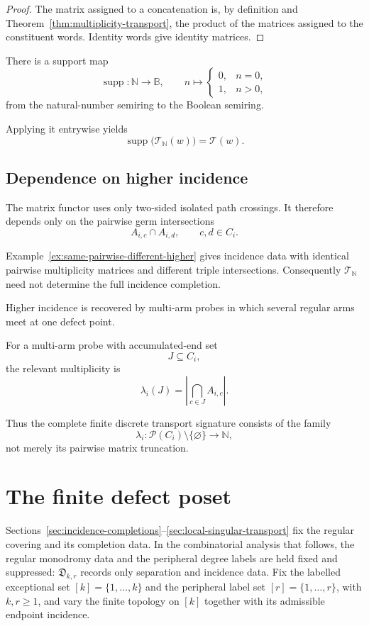 \documentclass[11pt]{article}
\theoremstyle{plain}
\theoremstyle{definition}
\begin{document}
\begin{proof}
The matrix assigned to a concatenation is, by definition and
Theorem~\ref{thm:multiplicity-transport}, the product of the matrices
assigned to the constituent words.  Identity words give identity
matrices.
\end{proof}

There is a support map
\[
\operatorname{supp}:
\mathbb N\longrightarrow\mathbb B,
\qquad
n\longmapsto
\begin{cases}
0,&n=0,\\
1,&n>0,
\end{cases}
\]
from the natural-number semiring to the Boolean semiring.

Applying it entrywise yields
\[
\operatorname{supp}
\bigl(
\mathscr T_{\mathbb N}(w)
\bigr)
=
\mathscr T(w).
\]


\subsection{Dependence on higher incidence}
\label{subsec:matrix-higher-incidence}

The matrix functor uses only two-sided isolated path crossings.  It therefore
depends only on the pairwise germ intersections
\[
A_{i,c}\cap A_{i,d},
\qquad c,d\in C_i.
\]

Example~\ref{ex:same-pairwise-different-higher} gives incidence data with identical
pairwise multiplicity matrices and different triple intersections.  Consequently
$\mathscr T_{\mathbb N}$ need not determine the full incidence completion.

Higher incidence is recovered by multi-arm probes in which several regular arms meet
at one defect point.

For a multi-arm probe with accumulated-end set
\[
J\subseteq C_i,
\]
the relevant multiplicity is
\[
\lambda_i(J)
=
\left|
\bigcap_{c\in J}A_{i,c}
\right|.
\]

Thus the complete finite discrete transport signature consists of the
family
\[
\lambda_i:
\mathcal P(C_i)\setminus\{\varnothing\}
\longrightarrow
\mathbb N,
\]
not merely its pairwise matrix truncation.





\section{The finite defect poset}
\label{sec:finite-defect-poset}

Sections~\ref{sec:incidence-completions}--\ref{sec:local-singular-transport}
fix the regular covering and its completion data.  In the combinatorial analysis that
follows, the regular monodromy data and the peripheral degree labels are held fixed and
suppressed: $\mathfrak D_{k,r}$ records only separation and incidence data.  Fix the
labelled exceptional set $[k]=\{1,\ldots,k\}$ and the peripheral label set
$[r]=\{1,\ldots,r\}$, with $k,r\geq1$, and vary the finite topology on $[k]$
together with its admissible endpoint incidence.
\end{document}
